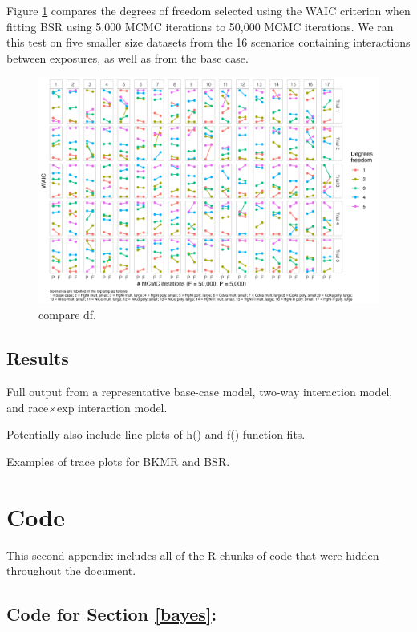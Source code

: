 \documentclass[12pt, twoside]{amherstthesis}
\begin{document}
Figure \ref{fig:comparedf} compares the degrees of freedom selected using the WAIC criterion when fitting BSR using 5,000 MCMC iterations to 50,000 MCMC iterations. We ran this test on five smaller size datasets from the 16 scenarios containing interactions between exposures, as well as from the base case.
\begin{figure}

{\centering \includegraphics[width=1\linewidth]{figures/test_waic2} 

}

\caption{compare df.}\label{fig:comparedf}
\end{figure}
\hypertarget{suppresults}{%
\section{Results}\label{suppresults}}

Full output from a representative base-case model, two-way interaction model, and race\(\times\)exp interaction model.

Potentially also include line plots of h() and f() function fits.

Examples of trace plots for BKMR and BSR.

\hypertarget{code}{%
\chapter{Code}\label{code}}

This second appendix includes all of the R chunks of code that were hidden throughout the document.

\hypertarget{code-for-section-refbayes}{%
\section{Code for Section \ref{bayes}:}\label{code-for-section-refbayes}}
\end{document}
